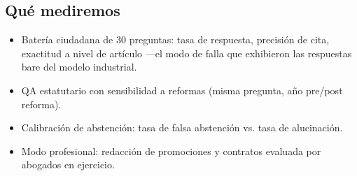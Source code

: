 \subsection{Qué mediremos}

\begin{itemize}
\item Batería ciudadana de 30 preguntas: tasa de respuesta, precisión de cita, exactitud a nivel de artículo ---el modo de falla que exhibieron las respuestas bare del modelo industrial.
\item QA estatutario con sensibilidad a reformas (misma pregunta, año pre/post reforma).
\item Calibración de abstención: tasa de falsa abstención vs. tasa de alucinación.
\item Modo profesional: redacción de promociones y contratos evaluada por abogados en ejercicio.
\end{itemize}
